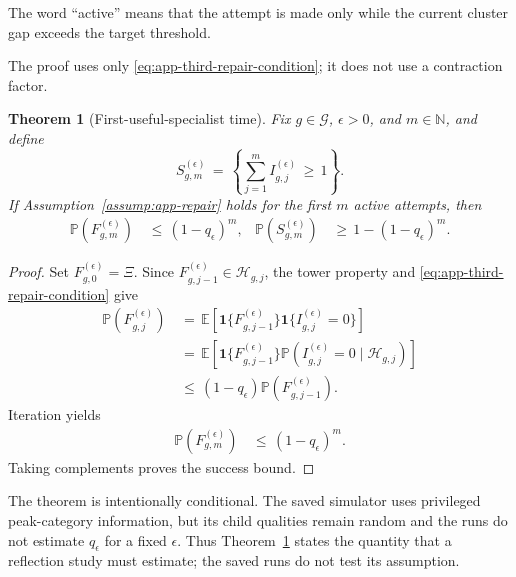 \documentclass{article} %
\newtheorem{theorem}{Theorem}
\begin{document}
The word ``active'' means that the attempt is made only while the current cluster gap exceeds the target threshold.

The proof uses only \eqref{eq:app-third-repair-condition}; it does not use a contraction factor.

\begin{theorem}[First-useful-specialist time]
\label{thm:generalization}
Fix \(g\in\mathcal G\), \(\epsilon>0\), and \(m\in\mathbb N\), and define
\begin{equation}
S_{g,m}^{(\epsilon)}
\,=\,
\left\{
\sum_{j=1}^{m}
I_{g,j}^{(\epsilon)}
\,\geq\,
1
\right\}.
\end{equation}
If Assumption~\ref{assump:app-repair} holds for the first \(m\) active
attempts, then
\begin{equation}
\begin{aligned}
\mathbb{P}\!\left(
F_{g,m}^{(\epsilon)}
\right)
&\,\leq\,(1-q_{\epsilon})^m, &
\mathbb{P}\!\left(S_{g,m}^{(\epsilon)}\right)
&\,\geq\,1-(1-q_{\epsilon})^m.
\end{aligned}
\end{equation}
\end{theorem}

\begin{proof}
Set \(F_{g,0}^{(\epsilon)}=\Xi\).  Since
\(F_{g,j-1}^{(\epsilon)}\in\mathcal H_{g,j}\), the tower property and
\eqref{eq:app-third-repair-condition} give
\begin{equation}
\begin{aligned}
\mathbb{P}\!\left(F_{g,j}^{(\epsilon)}\right)
&\,=\,
\mathbb{E}\!\left[
\mathbf{1}\{F_{g,j-1}^{(\epsilon)}\}
\mathbf{1}\{I_{g,j}^{(\epsilon)}=0\}
\right]
\\
&\,=\,
\mathbb{E}\!\left[
\mathbf{1}\{F_{g,j-1}^{(\epsilon)}\}
\mathbb{P}\!\left(
I_{g,j}^{(\epsilon)}=0
\mid
\mathcal{H}_{g,j}
\right)
\right] \\
&\,\le\,
(1-q_{\epsilon})
\mathbb{P}\!\left(F_{g,j-1}^{(\epsilon)}\right).
\end{aligned}
\end{equation}
Iteration yields
\begin{equation}
\begin{aligned}
\mathbb{P}\!\left(F_{g,m}^{(\epsilon)}\right)
&\,\leq\,(1-q_{\epsilon})^m.
\end{aligned}
\end{equation}
Taking complements proves the success bound.
\end{proof}

The theorem is intentionally conditional. The saved simulator uses privileged
peak-category information, but its child qualities remain random and the runs
do not estimate \(q_\epsilon\) for a fixed \(\epsilon\). Thus
Theorem~\ref{thm:generalization} states the quantity that a reflection study
must estimate; the saved runs do not test its assumption.
\end{document}
